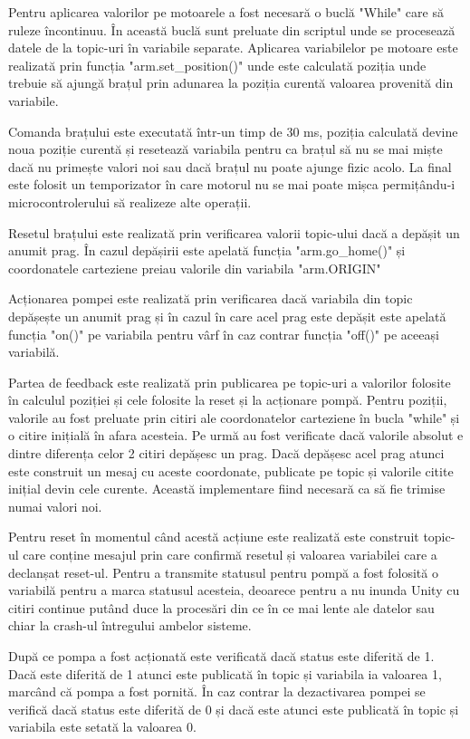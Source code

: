 Pentru aplicarea valorilor pe motoarele a fost necesară o buclă "While" care să ruleze încontinuu. În această buclă sunt preluate din scriptul unde se procesează datele de la topic-uri în variabile separate.
Aplicarea variabilelor pe motoare este realizată prin funcția "arm.set\_position()" unde este calculată poziția unde trebuie să ajungă brațul prin adunarea la poziția curentă valoarea provenită din variabile.


Comanda brațului este executată într-un timp de 30 ms, poziția calculată devine noua poziție curentă și resetează variabila pentru ca brațul să nu se mai miște dacă nu primește valori noi sau dacă brațul nu poate ajunge fizic acolo. La final este folosit un temporizator în care  motorul nu se mai poate mișca permițându-i microcontrolerului să realizeze alte operații.

Resetul brațului este realizată prin verificarea valorii topic-ului dacă a depășit un anumit prag. În cazul depășirii este apelată funcția "arm.go\_home()" și coordonatele carteziene preiau valorile din variabila "arm.ORIGIN"

Acționarea pompei este realizată prin verificarea dacă variabila din topic depășește un anumit prag și în cazul în care acel prag este depășit este apelată funcția "on()" pe variabila pentru vârf în caz contrar funcția "off()" pe aceeași variabilă.

Partea de feedback este realizată prin publicarea pe topic-uri a valorilor folosite în calculul poziției și cele folosite la reset și la acționare pompă. Pentru poziții, valorile au fost preluate prin citiri ale coordonatelor carteziene în bucla "while" și o citire inițială în afara acesteia. Pe urmă au fost verificate dacă valorile absolut e dintre diferența celor 2 citiri depășesc un prag. Dacă depășesc acel prag atunci este construit un mesaj cu aceste coordonate, publicate pe topic și valorile citite inițial devin cele curente. Această implementare fiind necesară ca să fie trimise numai valori noi.

Pentru reset în momentul când acestă acțiune este realizată este construit topic-ul care conține mesajul prin care confirmă resetul și valoarea variabilei care a declanșat reset-ul. 
Pentru a transmite statusul pentru pompă a fost folosită o variabilă pentru a marca statusul acesteia, deoarece pentru a nu inunda Unity cu citiri continue putând duce la procesări din ce în ce mai lente ale datelor sau chiar la crash-ul întregului ambelor sisteme.

După ce pompa a fost acționată este verificată dacă status este diferită de 1. Dacă este diferită de 1 atunci este publicată în topic și variabila ia valoarea 1, marcând că pompa a fost pornită. În caz contrar la dezactivarea pompei se verifică dacă status este diferită de 0 și dacă este atunci este publicată în topic și variabila este setată la valoarea 0.




